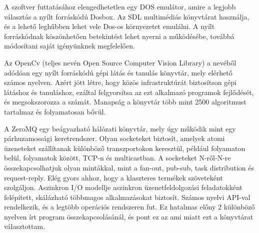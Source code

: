 

A szoftver futtatásához elengedhetetlen egy DOS emulátor, amire a legjobb választás a nyílt forráskódú Dosbox. Az SDL multimédiás könyvtárat használja, és a lehető leghűbben lehet vele Dos-os környezetet emulálni. A nyílt forráskódnak köszönhetően betekintést lehet nyerni a működésébe, továbbá módosítani saját igényünknek megfelelően. 


Az OpenCv (teljes nevén Open Source Computer Vision Library) a nevéből adódóan egy nyílt forráskódú gépi látás és tanulás könyvtár, mely elérhető számos nyelven. Azért jött létre, hogy közös infrastruktúrát biztosítson gépi látáshoz és tanuláshoz, ezáltal felgyorsítsa az ezt alkalmazó programok fejlődését, és megsokszorozza a számát. Manapság a könyvtár több mint 2500 algoritmust tartalmaz és folyamatosan bővül.


A ZeroMQ egy beágyazható hálózati könyvtár, mely úgy működik mint egy párhuzamossági keretrendszer. Olyan socketeket biztosít, amelyek atomi üzeneteket szállítanak különböző transzportokon keresztül, például folyamaton belül, folyamatok között, TCP-n és multicastban. A socketeket N-ről-N-re összekapcsolhatjuk olyan mintákkal, mint a fan-out, pub-sub, task distribution és request-reply. Elég gyors ahhoz, hogy a klaszteres termékek szöveteként szolgáljon. Aszinkron I/O modellje aszinkron üzenetfeldolgozási feladatokként felépített, skálázható többmagos alkalmazásokat biztosít. Számos nyelvi API-val rendelkezik, és a legtöbb operációs rendszeren fut. Ez hatalmas előny 2 különböző nyelven írt program összekapcsolásánál, és pont ez az ami miatt ezt a könyvtárat választottam.
\iffalse
\Section{Python}

asd

\Section{Numpy}

asd

\Section{Pyteserract}

asd
\fi
